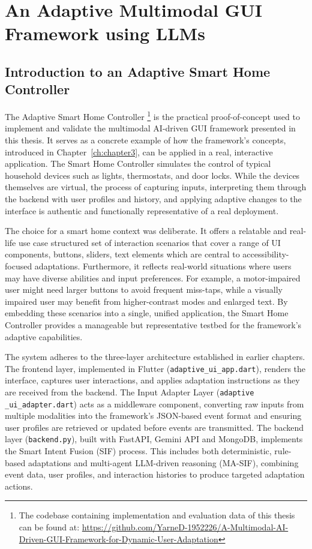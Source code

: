 \chapter{An Adaptive Multimodal GUI Framework using LLMs}
\label{ch:chapter5}

\section{Introduction to an Adaptive Smart Home Controller}
The Adaptive Smart Home Controller \footnote{The codebase containing implementation and evaluation data of this thesis can be found at: \url{https://github.com/YarneD-1952226/A-Multimodal-AI-Driven-GUI-Framework-for-Dynamic-User-Adaptation}} is the practical proof-of-concept used to implement and validate the multimodal AI-driven GUI framework presented in this thesis. It serves as a concrete example of how the framework’s concepts, introduced in Chapter~\ref{ch:chapter3}, can be applied in a real, interactive application. The Smart Home Controller simulates the control of typical household devices such as lights, thermostats, and door locks. While the devices themselves are virtual, the process of capturing inputs, interpreting them through the backend with user profiles and history, and applying adaptive changes to the interface is authentic and functionally representative of a real deployment.

The choice for a smart home context was deliberate. It offers a relatable and real-life use case structured set of interaction scenarios that cover a range of UI components, buttons, sliders, text elements which are central to accessibility-focused adaptations. Furthermore, it reflects real-world situations where users may have diverse abilities and input preferences. For example, a motor-impaired user might need larger buttons to avoid frequent miss-taps, while a visually impaired user may benefit from higher-contrast modes and enlarged text. By embedding these scenarios into a single, unified application, the Smart Home Controller provides a manageable but representative testbed for the framework’s adaptive capabilities.

The system adheres to the three-layer architecture established in earlier chapters. The frontend layer, implemented in Flutter (\texttt{adaptive\_ui\_app.dart}), renders the interface, captures user interactions, and applies adaptation instructions as they are received from the backend. The Input Adapter Layer (\texttt{adaptive\\\_ui\_adapter.dart}) acts as a middleware component, converting raw inputs from multiple modalities into the framework’s JSON-based event format and ensuring user profiles are retrieved or updated before events are transmitted. The backend layer (\texttt{backend.py}), built with FastAPI, Gemini API and MongoDB, implements the Smart Intent Fusion (SIF) process. This includes both deterministic, rule-based adaptations and multi-agent LLM-driven reasoning (MA-SIF), combining event data, user profiles, and interaction histories to produce targeted adaptation actions.

